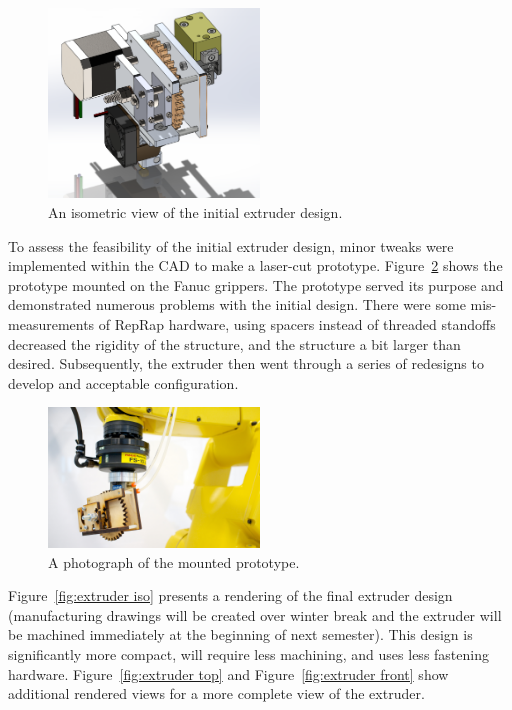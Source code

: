 \begin{figure}[htp]
\centering
\includegraphics[width=0.5\textwidth]{./figures/extruder-old-2}
\caption{An isometric view of the initial extruder design.}
\label{fig:old extruder}
\end{figure}

To assess the feasibility of the initial extruder design, minor tweaks were implemented within the CAD to make a laser-cut prototype.  Figure~\ref{fig:prototype extruder} shows the prototype mounted on the Fanuc grippers. The prototype served its purpose and demonstrated numerous problems with the initial design. There were some mis-measurements of RepRap hardware, using spacers instead of threaded standoffs decreased the rigidity of the structure, and the structure a bit larger than desired. Subsequently, the extruder then went through a series of redesigns to develop and acceptable configuration.\\

\begin{figure}[htp]
\centering
\includegraphics[width=0.5\textwidth]{./figures/extruder-prototype-2}
\caption{A photograph of the mounted prototype.}
\label{fig:prototype extruder}
\end{figure}

Figure~\ref{fig:extruder iso} presents a rendering of the final extruder design (manufacturing drawings will be created over winter break and the extruder will be machined immediately at the beginning of next semester). This design is significantly more compact, will require less machining, and uses less fastening hardware. Figure~\ref{fig:extruder top} and Figure~\ref{fig:extruder front} show additional rendered views for a more complete view of the extruder.\\

